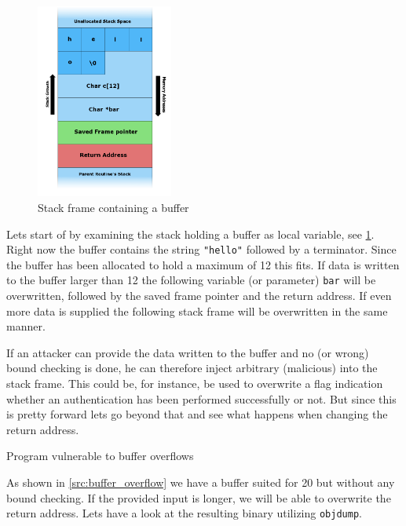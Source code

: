 \documentclass[article]{uibk}
\begin{document}
\begin{figure}[H]
    \centering
    \includegraphics[width=0.4\textwidth]{gfx/stack_smash.png}
    \caption{Stack frame containing a buffer}
    \label{fig:stack_frame}
\end{figure}

Lets start of by examining the stack holding a buffer as local variable, see
\cref{fig:stack_frame}. Right now the buffer contains the string
\texttt{"hello"} followed by a terminator. Since the buffer has been allocated
to hold a maximum of \SI{12}{\byte} this fits. If data is written to the buffer
larger than \SI{12}{\byte} the following variable (or parameter) \texttt{bar}
will be overwritten, followed by the saved frame pointer and the return
address. If even more data is supplied the following stack frame will be
overwritten in the same manner.

If an attacker can provide the data written to the buffer and no (or wrong)
bound checking is done, he can therefore inject arbitrary (malicious) into the
stack frame. This could be, for instance, be used to overwrite a flag
indication whether an authentication has been performed successfully or not.
But since this is pretty forward lets go beyond that and see what happens when
changing the return address.

\begin{listing}[h!]
    \caption{Program vulnerable to buffer overflows}
    \label{src:buffer_overflow}
\end{listing}

As shown in \cref{src:buffer_overflow} we have a buffer suited for
\SI{20}{\byte} but without any bound checking. If the provided input is longer,
we will be able to overwrite the return address. Lets have a look at the
resulting binary utilizing \texttt{objdump}.
\end{document}
